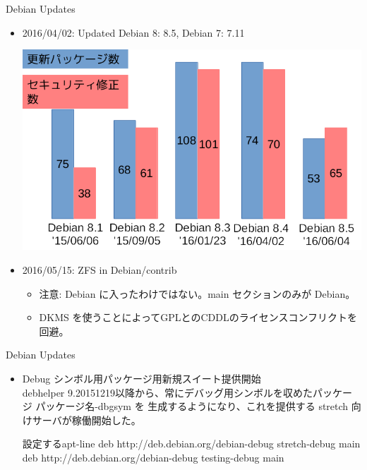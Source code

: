 \begin{frame}{Debian Updates}

\begin{itemize}[<+->]
\item 2016/04/02: Updated Debian 8: 8.5, Debian 7: 7.11

 \begin{center}
 \includegraphics[width=0.6\hsize]{image201606/debian-update.png}
 \end{center}

\item 2016/05/15: ZFS in Debian/contrib

	\begin{itemize}
		\item 注意: Debian に入ったわけではない。main セクションのみが Debian。
		\item DKMS を使うことによってGPLとのCDDLのライセンスコンフリクトを回避。
	\end{itemize}
\end{itemize}
\end{frame}

\begin{frame}{Debian Updates}

\begin{itemize}[<+->]
\item Debug シンボル用パッケージ用新規スイート提供開始 \\ \pause
debhelper 9.20151219以降から、常にデバッグ用シンボルを収めたパッケージ パッケージ名-dbgsym を
生成するようになり、これを提供する stretch 向けサーバが稼働開始した。

\begin{block}{設定するapt-line}
deb http://deb.debian.org/debian-debug stretch-debug main
deb http://deb.debian.org/debian-debug testing-debug main
\end{block}

\end{itemize}
\end{frame}

